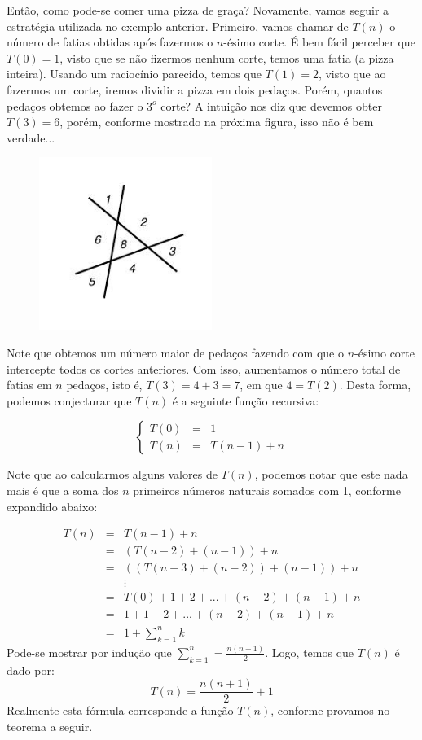 Então, como pode-se comer uma pizza de graça? Novamente, vamos seguir
a estratégia utilizada no exemplo anterior. Primeiro, vamos chamar de
$T(n)$ o número de fatias obtidas após fazermos o $n$-ésimo corte. É
bem fácil perceber que $T(0) = 1$, visto que se não fizermos nenhum
corte, temos uma fatia (a pizza inteira). Usando um raciocínio
parecido, temos que $T(1) = 2$, visto que ao fazermos um corte, iremos
dividir a pizza em dois pedaços. Porém, quantos pedaços obtemos ao
fazer o $3^o$ corte? A intuição nos diz que devemos obter $T(3) = 6$,
porém, conforme mostrado na próxima figura, isso não é bem verdade...

\begin{figure}[H]
  \centering
      \includegraphics[width=0.5\textwidth]{imagens/plane.jpg}
 \end{figure}

Note que obtemos um número maior de pedaços fazendo com que o
$n$-ésimo corte intercepte todos os cortes anteriores. Com isso,
aumentamos o número total de fatias em $n$ pedaços, isto é, $T(3) = 4
+ 3 = 7$, em que $4 = T(2)$. Desta forma, podemos conjecturar que
$T(n)$ é a seguinte função recursiva:

\[
\left\{
\begin{array}{lcl}
  T(0) & = & 1 \\
  T(n) & = & T(n - 1) + n
\end{array}
\right.
\]

Note que ao calcularmos alguns valores de $T(n)$, podemos notar que
este nada mais é que a soma dos $n$ primeiros números naturais somados
com 1, conforme expandido abaixo:

\[
\begin{array}{lcl}
T(n) & = & T(n - 1) + n \\
       & = & (T(n - 2) + (n - 1)) + n\\
       & = & ( (T(n - 3) + (n - 2)) + (n - 1)) + n\\
       &  & \vdots\\
       & = & T(0) + 1 + 2 + ... + (n -2) + (n - 1) + n\\
       & = & 1 + 1 + 2 + ... + (n -2) + (n - 1) + n\\
       & = & 1 + \sum_{k = 1}^nk
\end{array}
\]
Pode-se mostrar por indução que $\sum_{k = 1}^n =
\frac{n(n+1)}{2}$. Logo, temos que $T(n)$ é dado por:
\[
T(n) = \frac{n(n+1)}{2} + 1
\]
Realmente esta fórmula corresponde a função $T(n)$, conforme provamos
no teorema a seguir.

